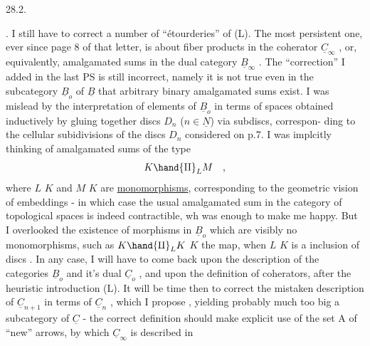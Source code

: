 
28.2.

. I still have to correct a number of ``étourderies'' of (L). The
most persistent one, ever since page 8 of that letter, is about fiber
products in the coherator $\underline{C}_\infty$ , or, equivalently, amalgamated sums in
the dual category $\underline{B}_\infty$ . The ``correction'' I added in the last PS   is
still incorrect, namely it is not true  even in the subcategory
$\underline{B}_o$ of $\underline{B}$ that arbitrary binary amalgamated sums exist. I was mislead
by the interpretation of elements of $\underline{B}_o$ in terms of  spaces\hand{,} obtained
inductively by gluing together discs $D_n$ ($n \in \underline{N}$) via subdiscs, correspon-%
ding to the cellular subidivisions of the discs $D_n$ considered on p.7.
I was implcitly thinking of amalgamated sums of the type
\[ K \hand{\amalg}_L M \quad , \]
where $L$ \hand{$\to$} $K$ and $M$ \hand{$\to$}$K$ are \uline{monomorphisms}, corresponding to the geometric
vision of embeddings - in which case the usual amalgamated sum in the
category of topological spaces is indeed contractible, wh was enough
to make me happy. But I overlooked the existence of morphisms in $\underline{B}_o$
which are visibly no monomorphisms, such as $K \hand{\amalg}_L K$ \hand{$\to$} $K$ the 
map, when $L$ \hand{$\to$}$K$ is a  inclusion of discs . In any case, I will have
to come back upon the description of the categories $\underline{B}_o$ and it's dual $\underline{C}_o$ ,
and upon the definition of coherators, after the heuristic introduction
(L). It will be time then  to correct the mistaken description of $\underline{C}_{n+1}$
in terms of $\underline{C}_n$ , which I propose  , yielding probably much too
big a subcategory of $\underline{C}$\hand{$_\infty$} - the correct definition should make explicit
use of the  set A of  ``new'' arrows, by which $\underline{C}_\infty$ is described in
